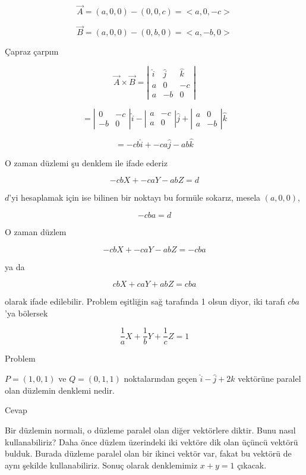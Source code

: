 \documentclass[12pt,fleqn]{article}\usepackage{../../common}
\begin{document}
$$
\vec{A} = (a,0,0) - (0,0,c) = < a,0,-c >
$$

$$
\vec{B} = (a,0,0) - (0,b,0) = < a,-b,0 >
$$

Çapraz çarpım

$$ \vec{A} \times \vec{B} =
\left|\begin{array}{rrr}
\hat{i}& \hat{j}& \hat{k} \\
a & 0 & -c \\
a & -b & 0 
\end{array}\right|
 $$

$$ = 
\left|\begin{array}{rr}
0 & -c \\
-b & 0
\end{array}\right| 
\hat{i}
-
\left|\begin{array}{rr}
a & -c \\
a & 0
\end{array}\right|
\hat{j}
+
\left|\begin{array}{rr}
a & 0 \\
a & -b
\end{array}\right|
\hat{k}
$$

$$ = -cb\hat{i} + -ca\hat{j} -ab \hat{k} $$

O zaman düzlemi şu denklem ile ifade ederiz 

$$ -cbX + -caY -abZ = d $$

$d$'yi hesaplamak için ise bilinen bir noktayı bu formüle sokarız, mesela
$(a,0,0)$, 

$$ -cba  = d $$

O zaman düzlem

$$ -cbX + -caY -abZ = -cba $$

ya da

$$ cbX + caY + abZ = cba $$

olarak ifade edilebilir. Problem eşitliğin sağ tarafında 1 olsun diyor, iki 
tarafı $cba$'ya bölersek

$$ \frac{1}{a}X + \frac{1}{b}Y + \frac{1}{c}Z = 1 $$

Problem

$P=(1,0,1)$ ve $Q=(0,1,1)$ noktalarından geçen $\hat{i}-\hat{j}+2\hat{k}$
vektörüne paralel olan düzlemin denklemi nedir.

Cevap

Bir düzlemin normali, o düzleme paralel olan diğer vektörlere diktir. Bunu nasıl
kullanabiliriz? Daha önce düzlem üzerindeki iki vektöre dik olan üçüncü vektörü
bulduk. Burada düzleme paralel olan bir ikinci vektör var, fakat bu vektörü de
aynı şekilde kullanabiliriz. Sonuç olarak denklemimiz $x+y =1$ çıkacak.
\end{document}
